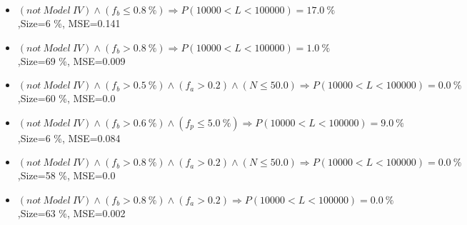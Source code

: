 \documentclass[numbered]{CSL}
\begin{document}
\begin{itemize}
\item $(not~Model~IV) \land (f_b \leq 0.8~\%) \Rightarrow P(10 000 < L < 100 000) = 17.0~\%$,\hfill Size=6 \%, MSE=0.141
\item $(not~Model~IV) \land (f_b > 0.8~\%) \Rightarrow P(10 000 < L < 100 000) = 1.0~\%$,\hfill Size=69 \%, MSE=0.009
\item $(not~Model~IV) \land (f_b > 0.5~\%) \land (f_a > 0.2) \land (N \leq 50.0) \Rightarrow P(10 000 < L < 100 000) = 0.0~\%$,\hfill Size=60 \%, MSE=0.0
\item $(not~Model~IV) \land (f_b > 0.6~\%) \land (f_p \leq 5.0~\%) \Rightarrow P(10 000 < L < 100 000) = 9.0~\%$,\hfill Size=6 \%, MSE=0.084
\item $(not~Model~IV) \land (f_b > 0.8~\%) \land (f_a > 0.2) \land (N \leq 50.0) \Rightarrow P(10 000 < L < 100 000) = 0.0~\%$,\hfill Size=58 \%, MSE=0.0
\item $(not~Model~IV) \land (f_b > 0.8~\%) \land (f_a > 0.2) \Rightarrow P(10 000 < L < 100 000) = 0.0~\%$,\hfill Size=63 \%, MSE=0.002
\end{itemize}
\end{document}
